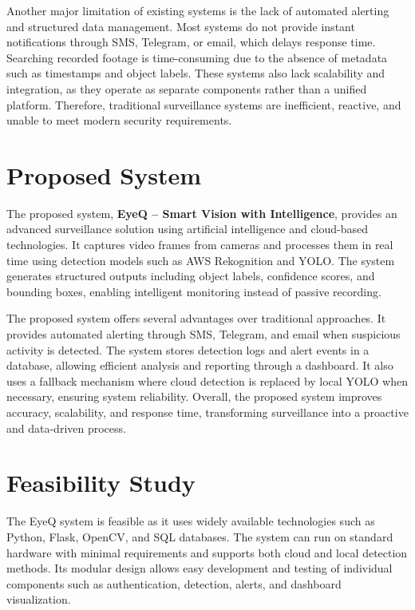 \documentclass[10pt,openany]{report}
\begin{document}
\begin{sloppypar}
{{{\begin{sloppypar}
Another major limitation of existing systems is the lack of automated alerting and structured data management. Most systems do not provide instant notifications through SMS, Telegram, or email, which delays response time. Searching recorded footage is time-consuming due to the absence of metadata such as timestamps and object labels. These systems also lack scalability and integration, as they operate as separate components rather than a unified platform. Therefore, traditional surveillance systems are inefficient, reactive, and unable to meet modern security requirements.

\section{Proposed System}

The proposed system, \textbf{EyeQ – Smart Vision with Intelligence}, provides an advanced surveillance solution using artificial intelligence and cloud-based technologies. It captures video frames from cameras and processes them in real time using detection models such as AWS Rekognition and YOLO. The system generates structured outputs including object labels, confidence scores, and bounding boxes, enabling intelligent monitoring instead of passive recording.

The proposed system offers several advantages over traditional approaches. It provides automated alerting through SMS, Telegram, and email when suspicious activity is detected. The system stores detection logs and alert events in a database, allowing efficient analysis and reporting through a dashboard. It also uses a fallback mechanism where cloud detection is replaced by local YOLO when necessary, ensuring system reliability. Overall, the proposed system improves accuracy, scalability, and response time, transforming surveillance into a proactive and data-driven process.

\section{Feasibility Study}

The EyeQ system is feasible as it uses widely available technologies such as Python, Flask, OpenCV, and SQL databases. The system can run on standard hardware with minimal requirements and supports both cloud and local detection methods. Its modular design allows easy development and testing of individual components such as authentication, detection, alerts, and dashboard visualization.


\end{sloppypar}}}}
\end{sloppypar}
\end{document}
